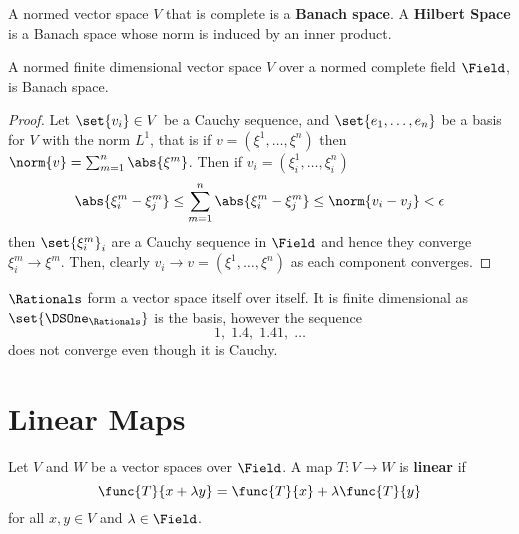 \begin{definition}
    A normed vector space \(V\) that is complete is a \textbf{Banach space}. A \textbf{Hilbert Space} is a Banach space whose norm is induced by an inner product.
\end{definition}


\begin{proposition} \label{pr:FiniteIsBanach}
    A normed finite dimensional vector space \(V\) over a normed complete field \(\Field\), is Banach space.
\end{proposition}

\begin{proof}
    Let \(\set{v_i} \in V\) be a Cauchy sequence, and \(\set{e_1, \dots ,e_n}\) be a basis for \(V\) with the norm \(L^1\), that is if \(v = (\xi^1 , \dots ,\xi^n)\) then \(\norm{v} = \sum_{m = 1}^n \abs{\xi^m}\). Then if \(v_i = (\xi^1_i , \dots , \xi^n_i)\)
    \begin{equation*}
        \abs{\xi^m_i - \xi^m_j} \leq \sum_{m=1}^n \abs{\xi^m_i - \xi^m_j} \leq \norm{v_i - v_j} < \epsilon
    \end{equation*}
    then \(\set{\xi^m_i}_i\) are a Cauchy sequence in \(\Field\) and hence they converge \(\xi^m_i \to \xi^m\). Then, clearly \(v_i \to v = (\xi^1 , \dots , \xi^n)\) as each component converges.
\end{proof}

\begin{example}
    \(\Rationals\) form a vector space itself over itself. It is finite dimensional as \(\set{\DSOne_\Rationals}\) is the basis, however the sequence
    \begin{equation*}
        1 ,\; 1.4 ,\; 1.41 ,\; \dots
    \end{equation*}
    does not converge even though it is Cauchy.
\end{example}

\section{Linear Maps}
Let \(V\) and \(W\) be a vector spaces over \(\Field\). A map \(T: V \to W\) is \textbf{linear} if
\begin{equation*}
    \func{T}{x + \lambda y} = \func{T}{x} + \lambda \func{T}{y}
\end{equation*}
for all \(x,y \in V\) and \(\lambda \in \Field\).

